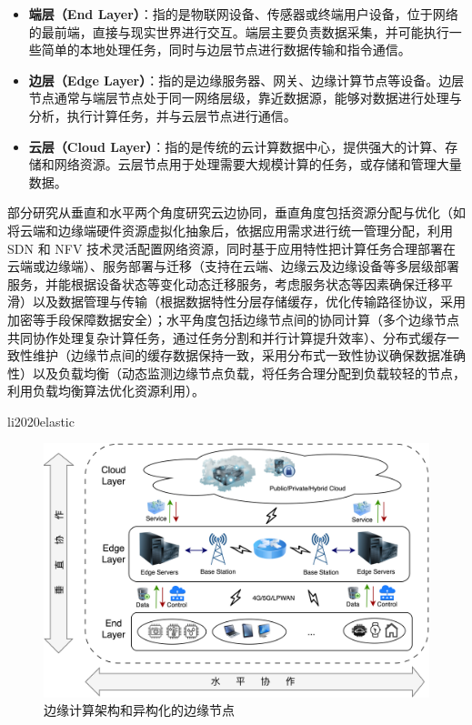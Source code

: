 \begin{itemize} 
\item \textbf{端层（End Layer）}：指的是物联网设备、传感器或终端用户设备，位于网络的最前端，直接与现实世界进行交互。端层主要负责数据采集，并可能执行一些简单的本地处理任务，同时与边层节点进行数据传输和指令通信。
\item \textbf{边层（Edge Layer）}：指的是边缘服务器、网关、边缘计算节点等设备。边层节点通常与端层节点处于同一网络层级，靠近数据源，能够对数据进行处理与分析，执行计算任务，并与云层节点进行通信。
\item \textbf{云层（Cloud Layer）}：指的是传统的云计算数据中心，提供强大的计算、存储和网络资源。云层节点用于处理需要大规模计算的任务，或存储和管理大量数据。
\end{itemize}




部分研究\cite{dupont2017edge,li2020elastic,shan2024kces}从垂直和水平两个角度研究云边协同，垂直角度包括资源分配与优化（如将云端和边缘端硬件资源虚拟化抽象后，依据应用需求进行统一管理分配，利用 SDN 和 NFV 技术灵活配置网络资源，同时基于应用特性把计算任务合理部署在云端或边缘端）、服务部署与迁移（支持在云端、边缘云及边缘设备等多层级部署服务，并能根据设备状态等变化动态迁移服务，考虑服务状态等因素确保迁移平滑）以及数据管理与传输（根据数据特性分层存储缓存，优化传输路径协议，采用加密等手段保障数据安全）；水平角度包括边缘节点间的协同计算（多个边缘节点共同协作处理复杂计算任务，通过任务分割和并行计算提升效率）、分布式缓存一致性维护（边缘节点间的缓存数据保持一致，采用分布式一致性协议确保数据准确性）以及负载均衡（动态监测边缘节点负载，将任务合理分配到负载较轻的节点，利用负载均衡算法优化资源利用）。


li2020elastic



\begin{figure}[ht]
  \centering
  \includegraphics[width=\linewidth]{pics/2-1云边端架构.png}
  \caption{边缘计算架构和异构化的边缘节点}
  \label{fig:my_label}
\end{figure}

